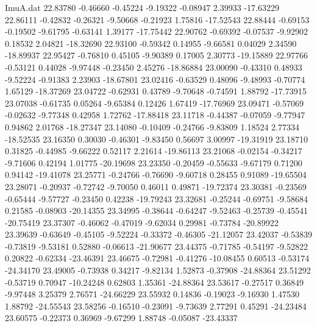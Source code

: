 \begin{filecontents}{ImuA.dat}
  22.83780   -0.46660   -0.45224   -9.19322   -0.08947    2.39933  -17.63229
  22.86111   -0.42832   -0.26321   -9.50668   -0.21923    1.75816  -17.52543
  22.88444   -0.69153   -0.19502   -9.61795   -0.63141    1.39177  -17.75442
  22.90762   -0.69392   -0.07537   -9.92902    0.18532    2.04821  -18.32690
  22.93100   -0.59342    0.14955   -9.66581    0.04029    2.34590  -18.89937
  22.95427   -0.76810    0.45105   -9.90389    0.17005    2.30773  -19.15889
  22.97766   -0.53121    0.44028   -9.97448   -0.23450    2.45276  -18.86884
  23.00090   -0.43310    0.48933   -9.52224   -0.91383    2.23903  -18.67801
  23.02416   -0.63529    0.48096   -9.48993   -0.70774    1.65129  -18.37269
  23.04722   -0.62931    0.43789   -9.70648   -0.74591    1.88792  -17.73915
  23.07038   -0.61735    0.05264   -9.65384    0.12426    1.67419  -17.76969
  23.09471   -0.57069   -0.02632   -9.77348    0.42958    1.72762  -17.88418
  23.11718   -0.44387   -0.07059   -9.77947    0.94862    2.01768  -18.27347
  23.14080   -0.10409   -0.24766   -9.83809    1.18524    2.77334  -18.52535
  23.16350    0.30030   -0.46301   -9.83450    0.56697    3.00997  -19.31919
  23.18710    0.31825   -0.44985   -9.66222    0.52117    2.21614  -19.86113
  23.21068   -0.02154   -0.34217   -9.71606    0.42194    1.01775  -20.19698
  23.23350   -0.20459   -0.55633   -9.67179    0.71200    0.94142  -19.41078
  23.25771   -0.24766   -0.76690   -9.60718    0.28455    0.91089  -19.65504
  23.28071   -0.20937   -0.72742   -9.70050    0.46011    0.49871  -19.72374
  23.30381   -0.23569   -0.65444   -9.57727   -0.23450    0.42238  -19.79243
  23.32681   -0.25244   -0.69751   -9.58684    0.21585   -0.08903  -20.14355
  23.34995   -0.38644   -0.64247   -9.52463   -0.25739   -0.45541  -20.75419
  23.37307   -0.46062   -0.47019   -9.62034    0.29981   -0.73784  -20.89922
  23.39639   -0.63649   -0.45105   -9.52224   -0.33372   -0.46305  -21.12057
  23.42037   -0.53839   -0.73819   -9.53181    0.52880   -0.06613  -21.90677
  23.44375   -0.71785   -0.54197   -9.52822    0.20822   -0.62334  -23.46391
  23.46675   -0.72981   -0.41276  -10.08455    0.60513   -0.53174  -24.34170
  23.49005   -0.73938    0.34217   -9.82134    1.52873   -0.37908  -24.88364
  23.51292   -0.53719    0.70947  -10.24248    0.62803    1.35361  -24.88364
  23.53617   -0.27517    0.36849   -9.97448    3.25379    2.76571  -24.66229
  23.55932    0.14836   -0.19023   -9.16930    1.47530    1.88792  -24.55543
  23.58256   -0.16510   -0.23091   -9.73639    2.77291    0.45291  -24.23484
  23.60575   -0.22373    0.36969   -9.67299    1.88748   -0.05087  -23.43337

\end{filecontents}
